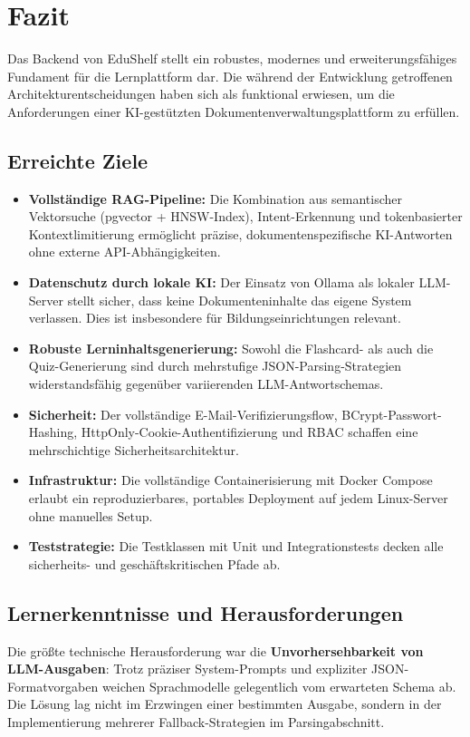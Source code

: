 \section{Fazit}
Das Backend von EduShelf stellt ein robustes, modernes und erweiterungsfähiges Fundament für die Lernplattform dar. Die während der Entwicklung getroffenen Architekturentscheidungen haben sich als funktional erwiesen, um die Anforderungen einer KI-gestützten Dokumentenverwaltungsplattform zu erfüllen.

\subsection{Erreichte Ziele}
\begin{itemize}
    \item \textbf{Vollständige RAG-Pipeline:} Die Kombination aus semantischer Vektorsuche (pgvector + HNSW-Index), Intent-Erkennung und tokenbasierter Kontextlimitierung ermöglicht präzise, dokumentenspezifische KI-Antworten ohne externe API-Abhängigkeiten.
    \item \textbf{Datenschutz durch lokale KI:} Der Einsatz von Ollama als lokaler LLM-Server stellt sicher, dass keine Dokumenteninhalte das eigene System verlassen. Dies ist insbesondere für Bildungseinrichtungen relevant.
    \item \textbf{Robuste Lerninhaltsgenerierung:} Sowohl die Flashcard- als auch die Quiz-Generierung sind durch mehrstufige JSON-Parsing-Strategien widerstandsfähig gegenüber variierenden LLM-Antwortschemas.
    \item \textbf{Sicherheit:} Der vollständige E-Mail-Verifizierungsflow, BCrypt-Passwort-Hashing, HttpOnly-Cookie-Authentifizierung und RBAC schaffen eine mehrschichtige Sicherheitsarchitektur.
    \item \textbf{Infrastruktur:} Die vollständige Containerisierung mit Docker Compose erlaubt ein reproduzierbares, portables Deployment auf jedem Linux-Server ohne manuelles Setup.
    \item \textbf{Teststrategie:} Die Testklassen mit Unit und Integrationstests decken alle sicherheits- und geschäftskritischen Pfade ab.
\end{itemize}

\subsection{Lernerkenntnisse und Herausforderungen}
Die größte technische Herausforderung war die \textbf{Unvorhersehbarkeit von LLM-Ausgaben}: Trotz präziser System-Prompts und expliziter JSON-Formatvorgaben weichen Sprachmodelle gelegentlich vom erwarteten Schema ab. Die Lösung lag nicht im Erzwingen einer bestimmten Ausgabe, sondern in der Implementierung mehrerer Fallback-Strategien im Parsingabschnitt.

